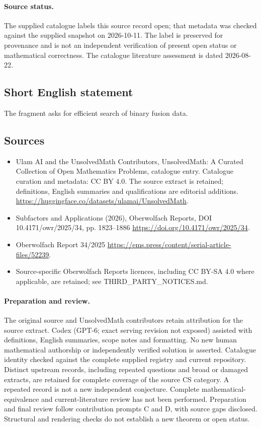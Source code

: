\documentclass[11pt]{article}
\begin{document}
\paragraph{Source status.}
The supplied catalogue labels this source record open; that metadata was checked against the supplied snapshot on 2026-10-11. The label is preserved for provenance and is not an independent verification of present open status or mathematical correctness. The catalogue literature assessment is dated 2026-08-22.
\subsection{Short English statement}
The fragment asks for efficient search of binary fusion data.
\subsection{Sources}
\begin{itemize}
\item[\hypertarget{source:statement:1}{S1}] Ulam AI and the UnsolvedMath Contributors, UnsolvedMath: A Curated Collection of Open Mathematics Problems, catalogue entry. Catalogue curation and metadata: CC BY 4.0. The source extract is retained; definitions, English summaries and qualifications are editorial additions.
\url{https://huggingface.co/datasets/ulamai/UnsolvedMath}.
\item[\hypertarget{source:statement:2}{S2}] Subfactors and Applications (2026), Oberwolfach Reports, DOI 10.4171/owr/2025/34, pp. 1823--1886
\url{https://doi.org/10.4171/owr/2025/34}.
\item[\hypertarget{source:statement:3}{S3}] Oberwolfach Report 34/2025
\url{https://ems.press/content/serial-article-files/52239}.
\item Source-specific Oberwolfach Reports licences, including CC BY-SA 4.0 where applicable, are retained; see THIRD\_PARTY\_NOTICES.md.
\end{itemize}
\paragraph{Preparation and review.}
The original source and UnsolvedMath contributors retain attribution for the source extract. Codex (GPT-6; exact serving revision not exposed) assisted with definitions, English summaries, scope notes and formatting. No new human mathematical authorship or independently verified solution is asserted. Catalogue identity checked against the complete supplied registry and current repository. Distinct upstream records, including repeated questions and broad or damaged extracts, are retained for complete coverage of the source CS category. A repeated record is not a new independent conjecture. Complete mathematical-equivalence and current-literature review has not been performed. Preparation and final review follow contribution prompts C and D, with source gaps disclosed. Structural and rendering checks do not establish a new theorem or open status.
\label{end:statement}
\end{document}

